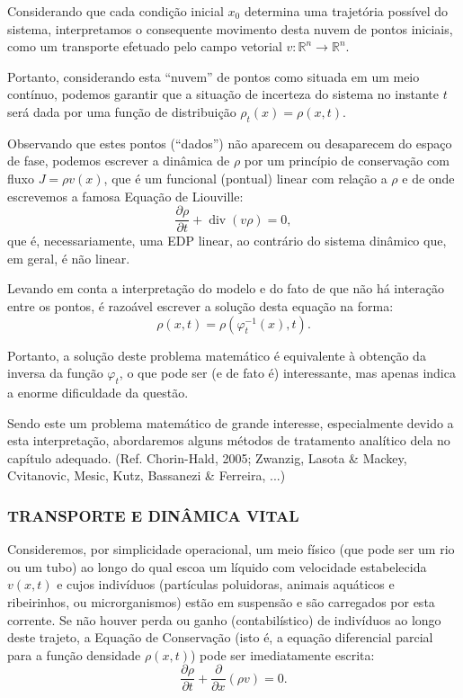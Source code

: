 Considerando que cada condição inicial \(x_0\) determina uma trajetória possível do sistema, interpretamos o consequente movimento desta nuvem de pontos iniciais, como um transporte efetuado pelo campo vetorial \(v: \mathbb{R}^n \to \mathbb{R}^n\). 

Portanto, considerando esta ``nuvem'' de pontos como situada em um meio contínuo, podemos garantir que a situação de incerteza do sistema no instante \(t\) será dada por uma função de distribuição \(\rho_t(x) = \rho(x,t)\).

Observando que estes pontos (``dados'') não aparecem ou desaparecem do espaço de fase, podemos escrever a dinâmica de \(\rho\) por um princípio de conservação com fluxo \(J = \rho v(x)\), que é um funcional (pontual) linear com relação a \(\rho\) e de onde escrevemos a famosa Equação de Liouville:
\begin{equation}
\dfrac{\partial \rho}{\partial t} + \operatorname{div}(v\rho) = 0,
\end{equation}
que é, necessariamente, uma EDP linear, ao contrário do sistema dinâmico que, em geral, é não linear.

Levando em conta a interpretação do modelo e do fato de que não há interação entre os pontos, é razoável escrever a solução desta equação na forma:
\[\rho(x,t) = \rho(\varphi_t^{-1}(x), t).\]

Portanto, a solução deste problema matemático é equivalente à obtenção da inversa da função \(\varphi_t\), o que pode ser (e de fato é) interessante, mas apenas indica a enorme dificuldade da questão.

Sendo este um problema matemático de grande interesse, especialmente devido a esta interpretação, abordaremos alguns métodos de tratamento analítico dela no capítulo adequado. (Ref.  Chorin-Hald, 2005; Zwanzig, Lasota \& Mackey, Cvitanovic, Mesic, Kutz, Bassanezi \& Ferreira, ...)

\subsubsection{TRANSPORTE E DINÂMICA VITAL}

Consideremos, por simplicidade operacional, um meio físico (que pode ser um rio ou um tubo) ao longo do qual escoa um líquido com velocidade estabelecida \(v(x,t)\) e cujos indivíduos (partículas poluidoras, animais aquáticos e ribeirinhos, ou microrganismos) estão em suspensão e são carregados por esta corrente. Se não houver perda ou ganho (contabilístico) de indivíduos ao longo deste trajeto, a Equação de Conservação (isto é, a equação diferencial parcial para a função densidade \(\rho(x,t)\)) pode ser imediatamente escrita:
\begin{equation}
\dfrac{\partial \rho}{\partial t} + \dfrac{\partial }{\partial x} (\rho v) = 0.
\end{equation}

